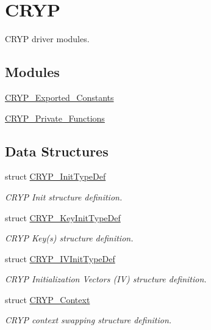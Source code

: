 \hypertarget{group___c_r_y_p}{\section{C\-R\-Y\-P}
\label{group___c_r_y_p}
}


C\-R\-Y\-P driver modules.  


\subsection*{Modules}
\begin{DoxyCompactItemize}
\item 
\hyperlink{group___c_r_y_p___exported___constants}{C\-R\-Y\-P\-\_\-\-Exported\-\_\-\-Constants}
\item 
\hyperlink{group___c_r_y_p___private___functions}{C\-R\-Y\-P\-\_\-\-Private\-\_\-\-Functions}
\end{DoxyCompactItemize}
\subsection*{Data Structures}
\begin{DoxyCompactItemize}
\item 
struct \hyperlink{struct_c_r_y_p___init_type_def}{C\-R\-Y\-P\-\_\-\-Init\-Type\-Def}
\begin{DoxyCompactList}\small\item\em C\-R\-Y\-P Init structure definition. \end{DoxyCompactList}\item 
struct \hyperlink{struct_c_r_y_p___key_init_type_def}{C\-R\-Y\-P\-\_\-\-Key\-Init\-Type\-Def}
\begin{DoxyCompactList}\small\item\em C\-R\-Y\-P Key(s) structure definition. \end{DoxyCompactList}\item 
struct \hyperlink{struct_c_r_y_p___i_v_init_type_def}{C\-R\-Y\-P\-\_\-\-I\-V\-Init\-Type\-Def}
\begin{DoxyCompactList}\small\item\em C\-R\-Y\-P Initialization Vectors (I\-V) structure definition. \end{DoxyCompactList}\item 
struct \hyperlink{struct_c_r_y_p___context}{C\-R\-Y\-P\-\_\-\-Context}
\begin{DoxyCompactList}\small\item\em C\-R\-Y\-P context swapping structure definition. \end{DoxyCompactList}\end{DoxyCompactItemize}
